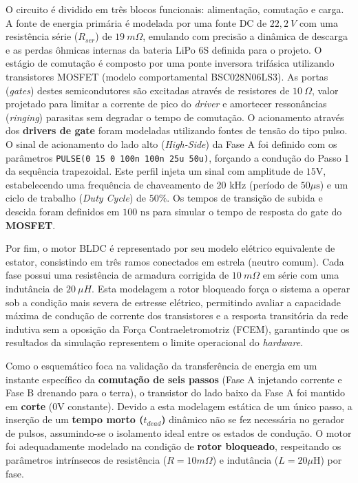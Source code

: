 O circuito é dividido em três blocos funcionais: alimentação, comutação e carga. A fonte de energia primária é modelada por uma fonte DC de $22,2 \: V$ com uma resistência série ($R_{ser}$) de $19 \: m\Omega$, emulando com precisão a dinâmica de descarga e as perdas ôhmicas internas da bateria LiPo 6S definida para o projeto. O estágio de comutação é composto por uma ponte inversora trifásica utilizando transistores MOSFET (modelo comportamental BSC028N06LS3). As portas (\textit{gates}) destes semicondutores são excitadas através de resistores de $10 \: \Omega$, valor projetado para limitar a corrente de pico do \textit{driver} e amortecer ressonâncias (\textit{ringing}) parasitas sem degradar o tempo de comutação. O acionamento através dos \textbf{drivers de gate} foram modeladas utilizando fontes de tensão do tipo pulso. O sinal de acionamento do lado alto (\textit{High-Side}) da Fase A foi definido com os parâmetros \texttt{PULSE(0 15 0 100n 100n 25u 50u)}, forçando a condução do Passo 1 da sequência trapezoidal. Este perfil injeta um sinal com amplitude de $15\text{V}$, estabelecendo uma frequência de chaveamento de \textbf{$20\text{ kHz}$} (período de $50 \mu\text{s}$) e um ciclo de trabalho (\textit{Duty Cycle}) de \textbf{$50\%$}. Os tempos de transição de subida e descida foram definidos em $100\text{ ns}$ para simular o tempo de resposta do gate do \textbf{MOSFET}.

Por fim, o motor BLDC é representado por seu modelo elétrico equivalente de estator, consistindo em três ramos conectados em estrela (neutro comum). Cada fase possui uma resistência de armadura corrigida de $10 \: m\Omega$ em série com uma indutância de $20 \: \mu H$. Esta modelagem a rotor bloqueado força o sistema a operar sob a condição mais severa de estresse elétrico, permitindo avaliar a capacidade máxima de condução de corrente dos transistores e a resposta transitória da rede indutiva sem a oposição da Força Contraeletromotriz (FCEM), garantindo que os resultados da simulação representem o limite operacional do \textit{hardware}. 

Como o esquemático foca na validação da transferência de energia em um instante específico da \textbf{comutação de seis passos} (Fase A injetando corrente e Fase B drenando para o terra), o transistor do lado baixo da Fase A foi mantido em \textbf{corte} ($0\text{V}$ constante). Devido a esta modelagem estática de um único passo, a inserção de um \textbf{tempo morto ($t_{dead}$)} dinâmico não se fez necessária no gerador de pulsos, assumindo-se o isolamento ideal entre os estados de condução. O motor foi adequadamente modelado na condição de \textbf{rotor bloqueado}, respeitando os parâmetros intrínsecos de resistência ($R = 10m \Omega$) e indutância ($L = 20 \mu\text{H}$) por fase.

